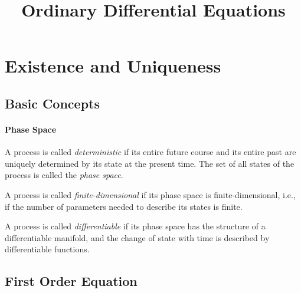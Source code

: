 



\title{Ordinary Differential Equations}
\label{chapter-ode}


\section{Existence and Uniqueness}
\label{section-existence-and-uniqueness}

\subsection{Basic Concepts}
\label{subsection-basic-concepts}

\paragraph{Phase Space}

\begin{definition}
  \label{definition-deterministic}
  \label{definition-phase-space}
  A process is called \emph{deterministic} if its entire future course and its entire past are uniquely determined by its state at the present time.
  The set of all states of the process is called the \emph{phase space}.
\end{definition}

\begin{definition}
  \label{definition-finite-dimensional}
  A process is called \emph{finite-dimensional} if its phase space is finite-dimensional, i.e., if the number of parameters needed to describe its states is finite.
\end{definition}

\begin{definition}
  \label{definition-differentiable}
  A process is called \emph{differentiable} if its phase space has the structure of a differentiable manifold, and the change of state with time is described by differentiable functions.
\end{definition}


\subsection{First Order Equation}
\label{subsection-existence-and-uniqueness-order-1}


